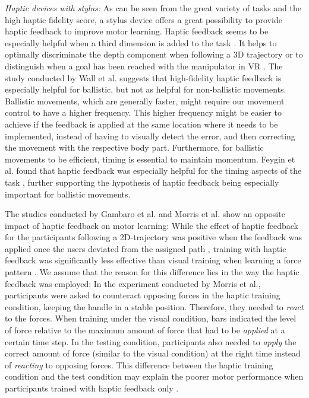 \textit{Haptic devices with stylus:} 
As can be seen from the great variety of tasks and the high haptic fidelity score, a stylus device offers a great possibility to provide haptic feedback to improve motor learning. Haptic feedback seems to be especially helpful when a third dimension is added to the task \cite{Feygin2002HapticSkill, Rodriguez2010, Gunter2022, Brickler2019}. It helps to optimally discriminate the depth component when following a 3D trajectory or to distinguish when a goal has been reached with the manipulator in VR \cite{Wall2000}. 
The study conducted by Wall et al. suggests that high-fidelity haptic feedback is especially helpful for ballistic, but not as helpful for non-ballistic movements. Ballistic movements, which are generally faster, might require our movement control to have a higher frequency. This higher frequency might be easier to achieve if the feedback is applied at the same location where it needs to be implemented, instead of having to visually detect the error, and then correcting the movement with the respective body part. Furthermore, for ballistic movements to be efficient, timing is essential to maintain momentum. Feygin et al. found that haptic feedback was especially helpful for the timing aspects of the task \cite{Feygin2002HapticSkill}, further supporting the hypothesis of haptic feedback being especially important for ballistic movements. 


The studies conducted by Gambaro et al. and Morris et al. show an opposite impact of haptic feedback on motor learning: While the effect of haptic feedback for the participants following a 2D-trajectory was positive when the feedback was applied once the users deviated from the assigned path \cite{Gambaro2014}, training with haptic feedback was significantly less effective than visual training when learning a force pattern \cite{Morris2007}. We assume that the reason for this difference lies in the way the haptic feedback was employed: In the experiment conducted by Morris et al., participants were asked to counteract opposing forces in the haptic training condition, keeping the handle in a stable position. Therefore, they needed to \textit{react} to the forces. 
When training under the visual condition, bars indicated the level of force relative to the maximum amount of force that had to be \textit{applied} at a certain time step. 
In the testing condition, participants also needed to \textit{apply} the correct amount of force (similar to the visual condition) at the right time instead of \textit{reacting} to opposing forces. 
This difference between the haptic training condition and the test condition may explain the poorer motor performance when participants trained with haptic feedback only \cite{Morris2007}.


